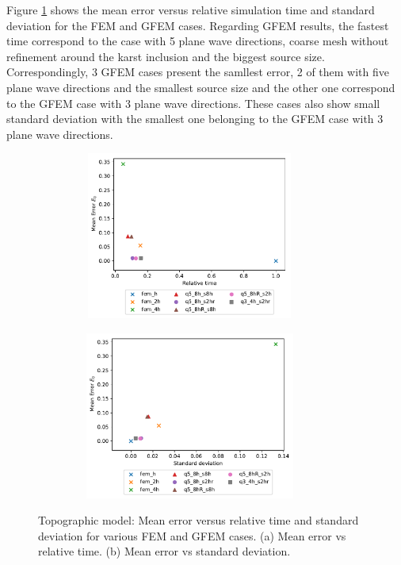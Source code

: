 \clearpage
Figure \ref{fig:3.49} shows the mean error versus relative simulation time and standard deviation for the FEM and GFEM cases. Regarding GFEM results, the fastest time correspond to the case with 5 plane wave directions, coarse mesh without refinement around the karst inclusion and the biggest source size. Correspondingly, 3 GFEM cases present the samllest error, 2 of them with five plane wave directions and the smallest source size and the other one correspond to the GFEM case with 3 plane wave directions. These cases also show small standard deviation with the smallest one belonging to the GFEM case with 3 plane wave directions.



 \begin{figure}[h!]
 		\centering
		\begin{subfigure}{8cm}
				\includegraphics[width=8cm, height=5.5cm]{Thesis_Edith/figures/topo/topo_waves/MeanError_time_topo.pdf}
			     \caption{}
		\end{subfigure}
        \hspace{0.25cm}	
		\begin{subfigure}{8cm}
				\includegraphics[width=8cm, height=5.5cm]{Thesis_Edith/figures/topo/topo_waves/MeanError_std_topo.pdf}
			   \caption{}
		\end{subfigure}
 
	\caption{Topographic model: Mean error versus relative time and standard deviation for various FEM and GFEM cases. (a) Mean error vs relative time. (b) Mean error vs standard deviation.}
	\label{fig:3.49}
\end{figure}
